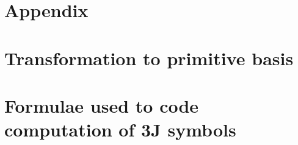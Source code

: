\documentclass[aps,floatfix,unsortedaddress]{revtex4}
\begin{document}


\section{Appendix}



\newpage
\section{Transformation to primitive basis}



\newpage
\section{Formulae used to code computation of 3J symbols}


\end{document}
